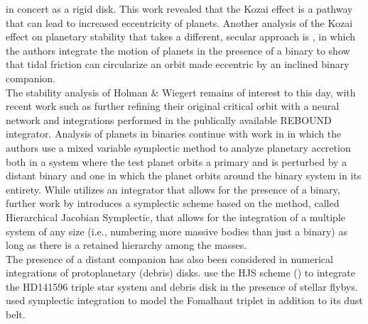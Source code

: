 \documentclass{aastex631}
\begin{document}
in concert as a rigid disk. This work revealed that the Kozai effect is a pathway that can lead to increased eccentricity of planets. 
Another analysis of the Kozai effect on planetary stability that 
takes a different, secular approach is \cite{fab07}, in which the authors integrate the motion of planets in the presence of a binary to show that tidal friction 
can circularize an orbit made eccentric by an inclined binary companion.\\
\indent The stability analysis of Holman \& Wiegert remains of interest to this day, with recent work such as \cite{lam18} further refining
their original critical orbit with a neural network and integrations performed in the publically available REBOUND integrator.
 Analysis of planets in binaries continue with work 
in \cite{cha02} in which the authors use a mixed variable symplectic method to analyze planetary accretion both in a system where the test planet orbits a primary and 
is perturbed by a distant binary and one in which the planet orbits around the binary system in its entirety. While \cite{cha02} utilizes an integrator that allows for the presence 
of a binary, further work by \cite{beu03} introduces a symplectic scheme based on the \cite{wis91} method, called Hierarchical Jacobian Symplectic, that allows for the 
integration of a multiple system of any size (i.e., numbering more massive bodies than just a binary) as long as there is a retained
hierarchy among the masses.  \\
The presence of a distant companion has also been considered in numerical integrations of protoplanetary (debris) disks. \cite{rec09} use the HJS scheme (\cite{beu03}) 
to integrate the HD141596 triple star system and debris disk in the presence of stellar flybys. 
\cite{beu14} used symplectic integration to model the Fomalhaut triplet in addition to its dust belt.  \\
\end{document}
